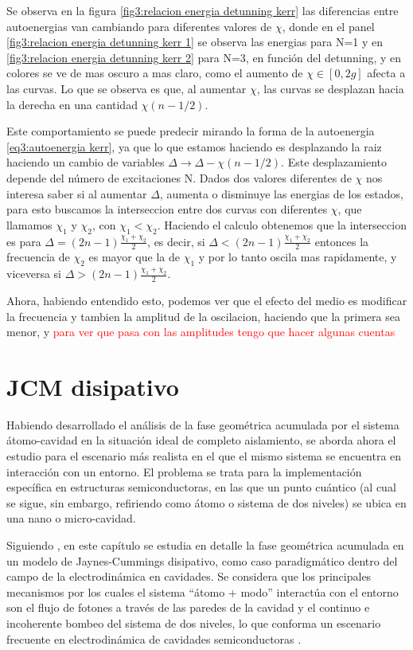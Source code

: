 Se observa en la figura \ref{fig3:relacion energia detunning kerr} las diferencias entre autoenergias van cambiando para diferentes valores de $\chi$, donde en el panel \ref{fig3:relacion energia detunning kerr 1} se observa las energias para N=1 y en \ref{fig3:relacion energia detunning kerr 2} para N=3, en función del detunning, y en colores se ve de mas oscuro a mas claro, como el aumento de $\chi \in [0,2g]$ afecta a las curvas. Lo que se observa es que, al aumentar $\chi$, las curvas se desplazan hacia la derecha en una cantidad $\chi(n-1/2)$. 

Este comportamiento se puede predecir mirando la forma de la autoenergia \ref{eq3:autoenergia kerr}, ya que lo que estamos haciendo es desplazando la raiz haciendo un cambio de variables $\Delta \rightarrow \Delta - \chi(n-1/2)$. Este desplazamiento depende del número de excitaciones N. 
Dados dos valores diferentes de $\chi$ nos interesa saber si al aumentar $\Delta$, aumenta o disminuye las energias de los estados, para esto buscamos la interseccion entre dos curvas con diferentes $\chi$, que llamamos $\chi_1$ y $\chi_2$, con $\chi_1<\chi_2$. Haciendo el calculo obtenemos que la interseccion es para $\Delta=(2n-1)\frac{\chi_1+\chi_2}{2}$, es decir, si $\Delta<(2n-1)\frac{\chi_1+\chi_2}{2}$ entonces la frecuencia de $\chi_2$ es mayor que la de $\chi_1$ y por lo tanto oscila mas rapidamente, y viceversa si $\Delta>(2n-1)\frac{\chi_1+\chi_2}{2}$.

Ahora, habiendo entendido esto, podemos ver que el efecto del medio es modificar la frecuencia y tambien la amplitud de la oscilacion, haciendo que la primera sea menor, y \textcolor{red}{para ver que pasa con las amplitudes tengo que hacer algunas cuentas}


\section{JCM disipativo}


Habiendo desarrollado el análisis de la fase geométrica acumulada por el sistema átomo-cavidad en la situación ideal de completo aislamiento, se aborda ahora el estudio para el escenario más realista en el que el mismo sistema se encuentra en interacción con un entorno. El problema se trata para la implementación específica en estructuras semiconductoras, en las que un punto cuántico (al cual se sigue, sin embargo, refiriendo como átomo o sistema de dos niveles) se ubica en una nano o micro-cavidad.

Siguiendo \cite{80}, en este capítulo se estudia en detalle la fase geométrica acumulada en un modelo de Jaynes-Cummings disipativo, como caso paradigmático dentro del campo de la electrodinámica en cavidades. Se considera que los principales mecanismos por los cuales el sistema “átomo + modo” interactúa con el entorno son el flujo de fotones a través de las paredes de la cavidad y el continuo e incoherente bombeo del sistema de dos niveles, lo que conforma un escenario frecuente en electrodinámica de cavidades semiconductoras \cite{81,82,83}. 

